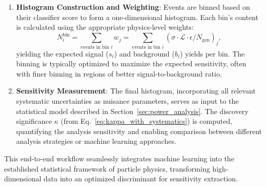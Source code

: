 \begin{enumerate}
    \item \textbf{Histogram Construction and Weighting}: Events are binned based on their classifier score to form a one-dimensional histogram. Each bin's content is calculated using the appropriate physics-level weights:
    \[
    N_i^{\text{bin}} = \sum_{\text{events in bin } i} w_j = \sum_{\text{events in bin } i} \left( \sigma \cdot \mathcal{L} \cdot \epsilon / N_{\text{gen}} \right)_j,
    \]
    yielding the expected signal ($s_i$) and background ($b_i$) yields per bin. The binning is typically optimized to maximize the expected sensitivity, often with finer binning in regions of better signal-to-background ratio.
    
    \item \textbf{Sensitivity Measurement}: The final histogram, incorporating all relevant systematic uncertainties as nuisance parameters, serves as input to the statistical model described in Section~\ref{sec:power_analysis}. The discovery significance $\kappa$ (from Eq.~\ref{eq:kappa_with_systematics}) is computed, quantifying the analysis sensitivity and enabling comparison between different analysis strategies or machine learning approaches.
\end{enumerate}

This end-to-end workflow seamlessly integrates machine learning into the established statistical framework of particle physics, transforming high-dimensional data into an optimized discriminant for sensitivity extraction.
